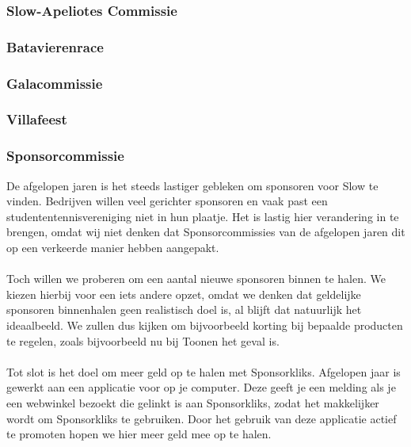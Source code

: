 \documentclass[]{article}
\begin{document}
\subsubsection{Slow-Apeliotes Commissie}

\subsubsection{Batavierenrace}

\subsubsection{Galacommissie}

\subsubsection{Villafeest}

\subsubsection{Sponsorcommissie}
De afgelopen jaren is het steeds lastiger gebleken om sponsoren voor Slow te vinden. Bedrijven willen veel gerichter sponsoren en vaak past een studententennisvereniging niet in hun plaatje. Het is lastig hier verandering in te brengen, omdat wij niet denken dat Sponsorcommissies van de afgelopen jaren dit op een verkeerde manier hebben aangepakt.\\\\
Toch willen we proberen om een aantal nieuwe sponsoren binnen te halen. We kiezen hierbij voor een iets andere opzet, omdat we denken dat geldelijke sponsoren binnenhalen geen realistisch doel is, al blijft dat natuurlijk het ideaalbeeld. We zullen dus kijken om bijvoorbeeld korting bij bepaalde producten te regelen, zoals bijvoorbeeld nu bij Toonen het geval is.\\\\
Tot slot is het doel om meer geld op te halen met Sponsorkliks. Afgelopen jaar is gewerkt aan een applicatie voor op je computer. Deze geeft je een melding als je een webwinkel bezoekt die gelinkt is aan Sponsorkliks, zodat het makkelijker wordt om Sponsorkliks te gebruiken. Door het gebruik van deze applicatie actief te promoten hopen we hier meer geld mee op te halen.
\end{document}
